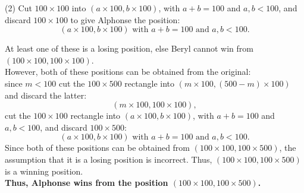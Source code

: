 \documentclass{article}
\begin{document}
(2) Cut $100\times 100$ into $(a\times 100, b\times 100)$, with $a+b=100$ and $a,b<100$, and discard $100\times100$ to give Alphonse the position:
$$(a\times100,b\times100)\text{ with } a + b = 100\text{ and } a,b<100.$$

At least one of these is a losing position, else Beryl cannot win from $(100\times 100, 100\times 100)$. \\
However, both of these positions can be obtained from the original: \\
since $m<100$ cut the $100\times 500$ rectangle into $(m\times100,(500-m)\times 100)$ and discard the latter:
$$(m\times100,100\times100),$$
cut the $100\times100$ rectangle into $(a\times 100, b\times 100)$, with $a+b=100$ and $a,b<100$, and discard $100\times500$:
$$(a\times100,b\times100)\text{ with } a + b = 100\text{ and } a,b<100.$$
Since both of these positions can be obtained from $(100\times 100, 100\times 500)$, the assumption that it is a losing position is incorrect. Thus, $(100\times 100, 100\times 500)$ is a winning position. \\

\textbf{Thus, Alphonse wins from the position $(100\times 100, 100\times 500)$.}
\end{document}
